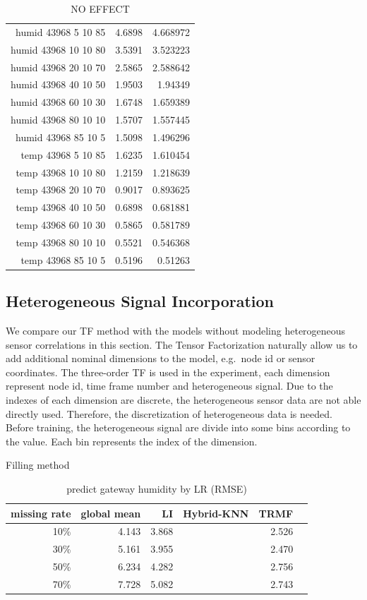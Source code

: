 \begin{table}[htbp]
\caption{NO EFFECT}
\label{noEff}
\begin{tabular}{r r r}
humid 43968  5 10 85	&4.6898	&4.668972\\
humid 43968 10 10 80	&3.5391	&3.523223\\
humid 43968 20 10 70	&2.5865	&2.588642\\
humid 43968 40 10 50	&1.9503	&1.94349\\
humid 43968 60 10 30	&1.6748	&1.659389\\
humid 43968 80 10 10	&1.5707	&1.557445\\
humid 43968 85 10 5	&1.5098	&1.496296\\
temp 43968  5 10 85	&1.6235	&1.610454\\
temp 43968 10 10 80	&1.2159	&1.218639\\
temp 43968 20 10 70	&0.9017	&0.893625\\
temp 43968 40 10 50	&0.6898	&0.681881\\
temp 43968 60 10 30	&0.5865	&0.581789\\
temp 43968 80 10 10	&0.5521	&0.546368\\
temp 43968 85 10 5	&0.5196	&0.51263\\
\end{tabular}
\end{table}

\subsection{Heterogeneous Signal Incorporation}

We compare our TF method with the models without modeling heterogeneous sensor correlations in this section.
The Tensor Factorization naturally allow us to add additional nominal dimensions to the model, e.g.\ node id or sensor coordinates.
The three-order TF is used in the experiment, each dimension represent node id, time frame number and heterogeneous signal.  
Due to the indexes of each dimension are discrete, the heterogeneous sensor data are not able directly used.
Therefore, the discretization of heterogeneous data is needed.
Before training, the heterogeneous signal are divide into some bins according to the value.
Each bin represents the index of the dimension.

\begin{table} [htbp]
\centering
\caption{predict gateway humidity by LR (RMSE) }
\label{table: LR}
   Filling method
\begin{tabular}{ r | r r r r r}
        missing rate&global mean     &LI   &Hybrid-KNN &TRMF\\ \hline
        10\%    &4.143&3.868&&2.526\\
        30\%    &5.161&3.955&&2.470\\
        50\%    &6.234&4.282&&2.756\\
        70\%   &7.728&5.082&&2.743\\
  
\end{tabular}
\end{table}

